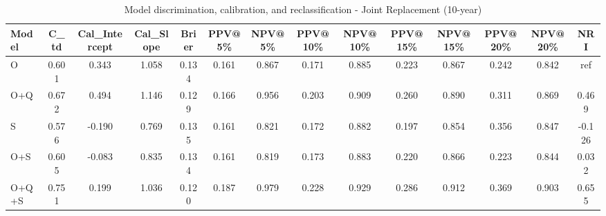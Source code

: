 \begin{table}[htbp]
\centering
\small
\caption{Model discrimination, calibration, and reclassification - Joint Replacement (10-year)}
\label{tab:perf_joint_10y}
\begin{tabular}{lccccccccccccc}
\toprule
Model & C\_td & Cal\_Intercept & Cal\_Slope & Brier & PPV@5\% & NPV@5\% & PPV@10\% & NPV@10\% & PPV@15\% & NPV@15\% & PPV@20\% & NPV@20\% & NRI \\
\midrule
O & 0.601 & 0.343 & 1.058 & 0.134 & 0.161 & 0.867 & 0.171 & 0.885 & 0.223 & 0.867 & 0.242 & 0.842 & ref \\
O+Q & 0.672 & 0.494 & 1.146 & 0.129 & 0.166 & 0.956 & 0.203 & 0.909 & 0.260 & 0.890 & 0.311 & 0.869 & 0.469 \\
S & 0.576 & -0.190 & 0.769 & 0.135 & 0.161 & 0.821 & 0.172 & 0.882 & 0.197 & 0.854 & 0.356 & 0.847 & -0.126 \\
O+S & 0.605 & -0.083 & 0.835 & 0.134 & 0.161 & 0.819 & 0.173 & 0.883 & 0.220 & 0.866 & 0.223 & 0.844 & 0.032 \\
O+Q+S & 0.751 & 0.199 & 1.036 & 0.120 & 0.187 & 0.979 & 0.228 & 0.929 & 0.286 & 0.912 & 0.369 & 0.903 & 0.655 \\
\bottomrule
\end{tabular}
\end{table}